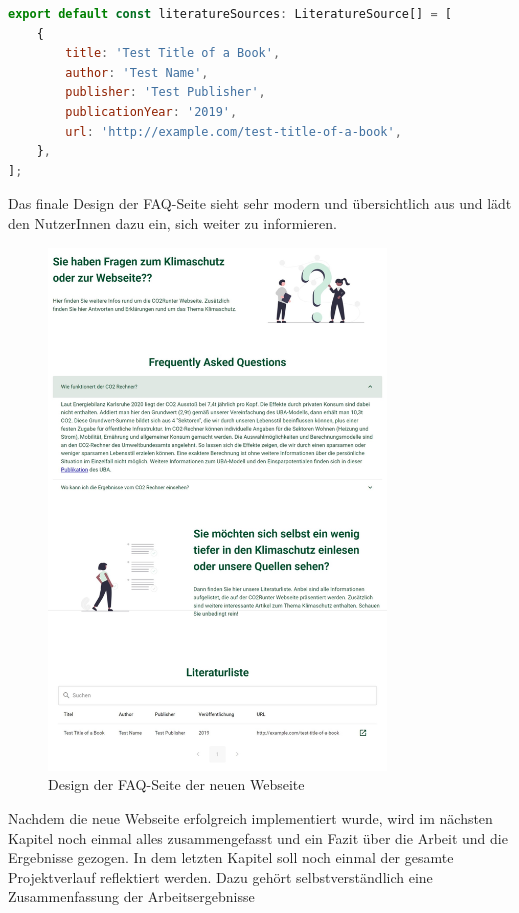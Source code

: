 \begin{lstlisting}[language={JavaScript}, caption={Literaturelemente}]
export default const literatureSources: LiteratureSource[] = [
    {
        title: 'Test Title of a Book',
        author: 'Test Name',
        publisher: 'Test Publisher',
        publicationYear: '2019',
        url: 'http://example.com/test-title-of-a-book',
    },
];
\end{lstlisting}

Das finale Design der FAQ-Seite sieht sehr modern und übersichtlich aus und lädt den NutzerInnen dazu ein, sich weiter zu informieren.

\begin{figure}[H]
    \centering
    \includegraphics[width=0.8\textwidth]{images/06/FAQ-Design.jpeg}
    \caption{Design der FAQ-Seite der neuen Webseite}
    \label{fig:new-co2runter-faq-design}
\end{figure}


Nachdem die neue Webseite erfolgreich implementiert wurde, wird im nächsten Kapitel noch einmal alles zusammengefasst und ein Fazit über die Arbeit und die Ergebnisse gezogen.
In dem letzten Kapitel soll noch einmal der gesamte Projektverlauf reflektiert werden.
Dazu gehört selbstverständlich eine Zusammenfassung der Arbeitsergebnisse